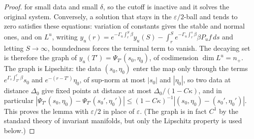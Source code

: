 \documentclass{article} %
\theoremstyle{plain}
\theoremstyle{definition}
\theoremstyle{remark}
\begin{document}
\begin{proof}
for small data and small $\delta$, so the cutoff is inactive and it solves the original system.
Conversely, a solution that stays in the $\varepsilon/2$-ball and tends to zero satisfies these
equations: variation of constants gives the stable and normal ones, and on $L^u$, writing
$y_u(r)=e^{-\Gamma_u\int_r^{S}\beta}y_u(S)-\int_r^Se^{-\Gamma_u\int_r^s\beta}\beta P_uf\,ds$ and
letting $S\to\infty$, boundedness forces the terminal term to vanish. The decaying set is
therefore the graph of $y_u(T')=\Psi_{T'}(s_0,\eta_0)$, of codimension $\dim L^u=n_+$. The
graph is Lipschitz: the data $(s_0,\eta_0)$ enter the map only through the terms
$e^{\Gamma_s\int_{T'}^r\beta}s_0$ and $e^{-(r-T')}\eta_0$, of sup-norm at most $|s_0|$ and
$|\eta_0|$, so two data at distance $\Delta_0$ give fixed points at distance at most
$\Delta_0/(1-C\kappa)$, and in particular $|\Psi_{T'}(s_0,\eta_0)-\Psi_{T'}(s_0',\eta_0')|\le
(1-C\kappa)^{-1}|(s_0,\eta_0)-(s_0',\eta_0')|$. This proves the lemma with $\varepsilon/2$ in place
of $\varepsilon$. (The graph is in fact $C^1$ by the standard theory of invariant manifolds, but
only the Lipschitz property is used below.)
\end{proof}
\end{document}
